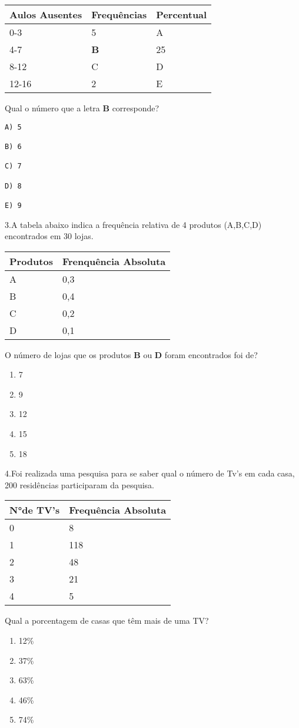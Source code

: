 \documentclass[]{book}
\begin{document}
\begin{longtable}[]{@{}lll@{}}
\toprule
Aulos Ausentes & Frequências & Percentual\tabularnewline
\midrule
\endhead
0-3 & 5 & A\tabularnewline
4-7 & \textbf{B} & 25\tabularnewline
8-12 & C & D\tabularnewline
12-16 & 2 & E\tabularnewline
\bottomrule
\end{longtable}

Qual o número que a letra \textbf{B} corresponde?

\begin{verbatim}
A) 5

B) 6

C) 7

D) 8

E) 9
\end{verbatim}

3.A tabela abaixo indica a frequência relativa de 4 produtos (A,B,C,D) encontrados em 30 lojas.

\begin{longtable}[]{@{}ll@{}}
\toprule
Produtos & Frenquência Absoluta\tabularnewline
\midrule
\endhead
A & 0,3\tabularnewline
B & 0,4\tabularnewline
C & 0,2\tabularnewline
D & 0,1\tabularnewline
\bottomrule
\end{longtable}

O número de lojas que os produtos \textbf{B} ou \textbf{D} foram encontrados foi de?

\begin{enumerate}
\def\labelenumi{\Alph{enumi})}
\item
  7
\item
  9
\item
  12
\item
  15
\item
  18
\end{enumerate}

4.Foi realizada uma pesquisa para se saber qual o número de Tv's em cada casa, 200 residências participaram da pesquisa.

\begin{longtable}[]{@{}ll@{}}
\toprule
N°de TV's & Frequência Absoluta\tabularnewline
\midrule
\endhead
0 & 8\tabularnewline
1 & 118\tabularnewline
2 & 48\tabularnewline
3 & 21\tabularnewline
4 & 5\tabularnewline
\bottomrule
\end{longtable}

Qual a porcentagem de casas que têm mais de uma TV?

\begin{enumerate}
\def\labelenumi{\Alph{enumi})}
\item
  12\%
\item
  37\%
\item
  63\%
\item
  46\%
\item
  74\%
\end{enumerate}
\end{document}
